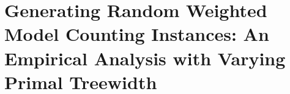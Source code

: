 \chapter{Generating Random Weighted Model Counting Instances: An Empirical Analysis with Varying Primal Treewidth}
